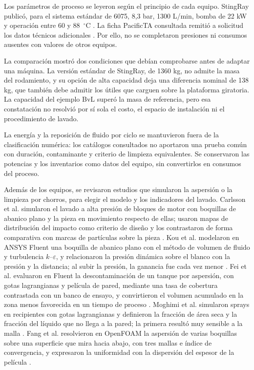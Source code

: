 Los parámetros de proceso se leyeron según el principio de cada equipo. StingRay publicó, para el sistema estándar de 6075, 8,3 bar, 1300 L/min, bomba de 22 kW y operación entre 60 y 88~$^\circ$C \cite{stingray_6075}. La ficha PacificTA consultada remitió a solicitud los datos técnicos adicionales \cite{bvl_pacific}. Por ello, no se completaron presiones ni consumos ausentes con valores de otros equipos.

La comparación mostró dos condiciones que debían comprobarse antes de adaptar una máquina. La versión estándar de StingRay, de 1360 kg, no admite la masa del rodamiento, y su opción de alta capacidad deja una diferencia nominal de 138 kg, que también debe admitir los útiles que carguen sobre la plataforma giratoria. La capacidad del ejemplo BvL superó la masa de referencia, pero esa constatación no resolvió por sí sola el costo, el espacio de instalación ni el procedimiento de lavado.

La energía y la reposición de fluido por ciclo se mantuvieron fuera de la clasificación numérica: los catálogos consultados no aportaron una prueba común con duración, contaminante y criterio de limpieza equivalentes. Se conservaron las potencias y los inventarios como datos del equipo, sin convertirlos en consumos del proceso.

Además de los equipos, se revisaron estudios que simularon la aspersión o la limpieza por chorros, para elegir el modelo y los indicadores del lavado. Carlsson et al. simularon el lavado a alta presión de bloques de motor con boquillas de abanico plano y la pieza en movimiento respecto de ellas; usaron mapas de distribución del impacto como criterio de diseño y los contrastaron de forma comparativa con marcas de partículas sobre la pieza \cite{carlsson2018}. Kou et al. modelaron en ANSYS Fluent una boquilla de abanico plano con el método de volumen de fluido y turbulencia $k$--$\varepsilon$, y relacionaron la presión dinámica sobre el blanco con la presión y la distancia; al subir la presión, la ganancia fue cada vez menor \cite{kou2020}. Fei et al. evaluaron en Fluent la descontaminación de un tanque por aspersión, con gotas lagrangianas y película de pared, mediante una tasa de cobertura contrastada con un banco de ensayo, y convirtieron el volumen acumulado en la zona menos favorecida en un tiempo de proceso \cite{fei2026}. Moghimi et al. simularon sprays en recipientes con gotas lagrangianas y definieron la fracción de área seca y la fracción del líquido que no llega a la pared; la primera resultó muy sensible a la malla \cite{moghimi2025}. Fang et al. resolvieron en OpenFOAM la aspersión de varias boquillas sobre una superficie que mira hacia abajo, con tres mallas e índice de convergencia, y expresaron la uniformidad con la dispersión del espesor de la película \cite{fang2023}.

